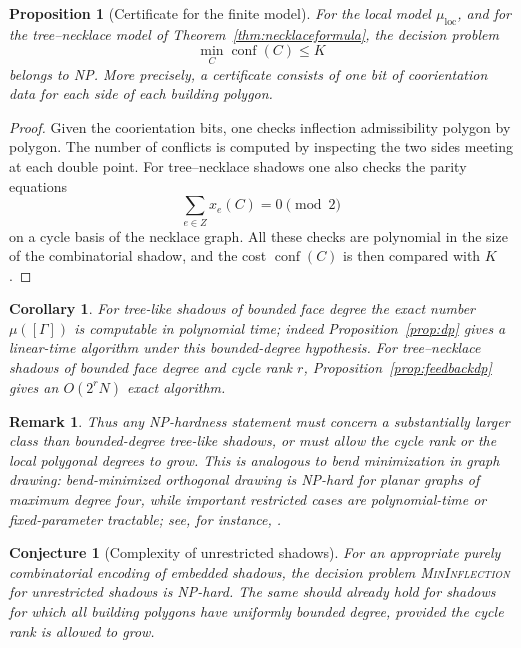 \documentclass[11pt]{article}
\newtheorem{proposition}[theorem]{Proposition}
\newtheorem{corollary}[theorem]{Corollary}
\newtheorem{conjecture}[theorem]{Conjecture}
\newtheorem{remark}[theorem]{Remark}
\newcommand{\conf}{\operatorname{conf}}
\newcommand{\loc}{\mathrm{loc}}
\begin{document}
\begin{proposition}[Certificate for the finite model]\label{prop:inNP}
For the local model $\mu_{\loc}$, and for the tree--necklace model of Theorem~\ref{thm:necklaceformula}, the decision problem
\[
 \min_C \conf(C)\le K
\]
belongs to NP.  More precisely, a certificate consists of one bit of coorientation data for each side of each building polygon.
\end{proposition}

\begin{proof}
Given the coorientation bits, one checks inflection admissibility polygon by polygon.  The number of conflicts is computed by inspecting the two sides meeting at each double point.  For tree--necklace shadows one also checks the parity equations
\[
 \sum_{e\in Z}x_e(C)=0\pmod 2
\]
on a cycle basis of the necklace graph.  All these checks are polynomial in the size of the combinatorial shadow, and the cost $\conf(C)$ is then compared with $K$.
\end{proof}

\begin{corollary}\label{cor:complexitypositive}
For tree-like shadows of bounded face degree the exact number $\mu([\Gamma])$ is computable in polynomial time; indeed Proposition~\ref{prop:dp} gives a linear-time algorithm under this bounded-degree hypothesis.  For tree--necklace shadows of bounded face degree and cycle rank $r$, Proposition~\ref{prop:feedbackdp} gives an $O(2^rN)$ exact algorithm.
\end{corollary}

\begin{remark}
Thus any NP-hardness statement must concern a substantially larger class than bounded-degree tree-like shadows, or must allow the cycle rank or the local polygonal degrees to grow.  This is analogous to bend minimization in graph drawing: bend-minimized orthogonal drawing is NP-hard for planar graphs of maximum degree four, while important restricted cases are polynomial-time or fixed-parameter tractable; see, for instance, \cite{ChangYen}.
\end{remark}

\begin{conjecture}[Complexity of unrestricted shadows]\label{conj:nphard}
For an appropriate purely combinatorial encoding of embedded shadows, the decision problem \textnormal{\textsc{MinInflection}} for unrestricted shadows is NP-hard.  The same should already hold for shadows for which all building polygons have uniformly bounded degree, provided the cycle rank is allowed to grow.
\end{conjecture}
\end{document}
